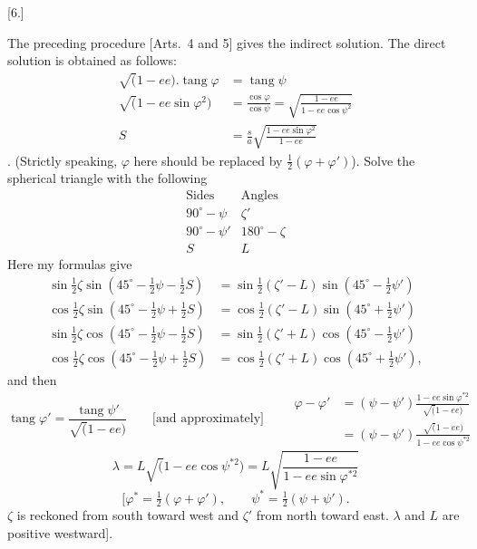 \clearpage
\noindent\makebox[12mm][l]{}\par\medskip
\begin{center}[6.]\end{center}
The preceding procedure [Arts.~4 and 5] gives the indirect solution. The direct
solution is obtained as follows:
\[
\begin{aligned}
\surd(1-ee).\operatorname{tang}\varphi&=\operatorname{tang}\psi\\
\surd(1-ee\sin\varphi^2)&=\frac{\cos\varphi}{\cos\psi}
=\sqrt{\frac{1-ee}{1-ee\cos\psi^2}}\\
S&=\frac sa\sqrt{\frac{1-ee\sin\varphi^2}{1-ee}}
\end{aligned}
\]
.
(Strictly speaking, \(\varphi\) here should be replaced by \(\tfrac12(\varphi+\varphi')\)).
Solve the spherical triangle with the following
\[
\begin{array}{c|c}
\text{Sides}&\text{Angles}\\\hline
90^\circ-\psi&\zeta'\\
90^\circ-\psi'&180^\circ-\zeta\\
S&L
\end{array}
\]
\noindent[Cf. Vol.~IV, p.~286 ff.] Here my formulas give
\[
\begin{aligned}
\sin\tfrac12\zeta\sin(45^\circ-\tfrac12\psi-\tfrac12S)
&=\sin\tfrac12(\zeta'-L)\sin(45^\circ-\tfrac12\psi')\\
\cos\tfrac12\zeta\sin(45^\circ-\tfrac12\psi+\tfrac12S)
&=\cos\tfrac12(\zeta'-L)\sin(45^\circ+\tfrac12\psi')\\
\sin\tfrac12\zeta\cos(45^\circ-\tfrac12\psi-\tfrac12S)
&=\sin\tfrac12(\zeta'+L)\cos(45^\circ-\tfrac12\psi')\\
\cos\tfrac12\zeta\cos(45^\circ-\tfrac12\psi+\tfrac12S)
&=\cos\tfrac12(\zeta'+L)\cos(45^\circ+\tfrac12\psi'),
\end{aligned}
\]
\noindent and then
\[
\operatorname{tang}\varphi'=\frac{\operatorname{tang}\psi'}{\surd(1-ee)}
\qquad\text{[and approximately]}\qquad
\begin{aligned}
\varphi-\varphi'&=(\psi-\psi')\frac{1-ee\sin\varphi^{*2}}{\surd(1-ee)}\\
&=(\psi-\psi')\frac{\surd(1-ee)}{1-ee\cos\psi^{*2}}
\end{aligned}
\]
\[
\lambda=L\surd(1-ee\cos\psi^{*2})
=L\sqrt{\frac{1-ee}{1-ee\sin\varphi^{*2}}}
\]
\[
[\varphi^*=\tfrac12(\varphi+\varphi'),\qquad
\psi^*=\tfrac12(\psi+\psi').
\]
\noindent\(\zeta\) is reckoned from south toward west and \(\zeta'\) from north toward east. \(\lambda\) and \(L\) are positive westward].

